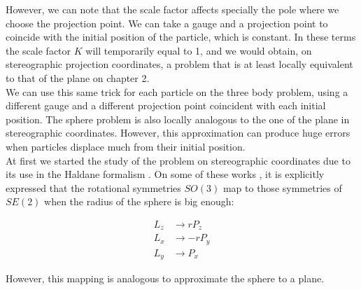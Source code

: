 However, we can note that the scale factor affects specially the pole where we choose the projection point. We can take a gauge and a projection point to coincide with the initial position of the particle, which is constant. In these terms the scale factor $K$ will temporarily equal to 1, and we would obtain, on stereographic projection coordinates, a problem that is at least locally equivalent to that of the plane on chapter 2.\\

We can use this same trick for each particle on the three body problem, using a different gauge and a different projection point coincident with each initial position. The sphere problem is also locally analogous to the one of the plane in stereographic coordinates. However, this approximation can produce huge errors when particles displace much from their initial position.\\

At first we started the study of the problem on stereographic coordinates due to its use in the Haldane formalism \cite{haldane}\cite{haldane2}\cite{haldane3}. On some of these works \cite{haldane2}\cite{haldane3}, it is explicitly expressed that the rotational symmetries $SO(3)$ map to those symmetries of $SE(2)$ when the radius of the sphere is big enough:

\begin{align*}
L_z &\to rP_z\\
L_x &\to -rP_y\\
L_y &\to P_x
\end{align*}

However, this mapping is analogous to approximate the sphere to a plane.\\




































